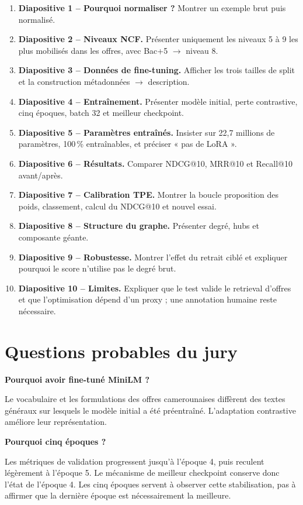 \documentclass[12pt,a4paper]{article}
\begin{document}
\begin{enumerate}
  \item \textbf{Diapositive 1 -- Pourquoi normaliser ?} Montrer un exemple brut puis normalisé.
  \item \textbf{Diapositive 2 -- Niveaux NCF.} Présenter uniquement les niveaux 5 à 9 les plus
  mobilisés dans les offres, avec Bac+5 $\rightarrow$ niveau 8.
  \item \textbf{Diapositive 3 -- Données de fine-tuning.} Afficher les trois tailles de split et
  la construction métadonnées $\rightarrow$ description.
  \item \textbf{Diapositive 4 -- Entraînement.} Présenter modèle initial, perte contrastive,
  cinq époques, batch 32 et meilleur checkpoint.
  \item \textbf{Diapositive 5 -- Paramètres entraînés.} Insister sur 22,7 millions de paramètres,
  100\,\% entraînables, et préciser « pas de LoRA ».
  \item \textbf{Diapositive 6 -- Résultats.} Comparer NDCG@10, MRR@10 et Recall@10 avant/après.
  \item \textbf{Diapositive 7 -- Calibration TPE.} Montrer la boucle proposition des poids,
  classement, calcul du NDCG@10 et nouvel essai.
  \item \textbf{Diapositive 8 -- Structure du graphe.} Présenter degré, hubs et composante géante.
  \item \textbf{Diapositive 9 -- Robustesse.} Montrer l'effet du retrait ciblé et expliquer
  pourquoi le score n'utilise pas le degré brut.
  \item \textbf{Diapositive 10 -- Limites.} Expliquer que le test valide le retrieval d'offres et
  que l'optimisation dépend d'un proxy ; une annotation humaine reste nécessaire.
\end{enumerate}

\section{Questions probables du jury}

\textbf{Pourquoi avoir fine-tuné MiniLM ?}\par
Le vocabulaire et les formulations des offres camerounaises diffèrent des textes généraux sur
lesquels le modèle initial a été préentraîné. L'adaptation contrastive améliore leur représentation.

\textbf{Pourquoi cinq époques ?}\par
Les métriques de validation progressent jusqu'à l'époque 4, puis reculent légèrement à l'époque 5.
Le mécanisme de meilleur checkpoint conserve donc l'état de l'époque 4. Les cinq époques servent
à observer cette stabilisation, pas à affirmer que la dernière époque est nécessairement la meilleure.
\end{document}
